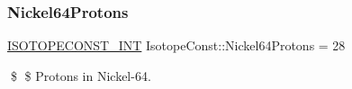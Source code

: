 \subsubsection{\texorpdfstring{Nickel64\+Protons}{Nickel64Protons}}
{\footnotesize\ttfamily \mbox{\hyperlink{group___isotope_const-_macros_ga5f18360b3e99483a35c32d789e62621c}{I\+S\+O\+T\+O\+P\+E\+C\+O\+N\+S\+T\+\_\+\+I\+NT}} Isotope\+Const\+::\+Nickel64\+Protons = 28}

\$ \$ Protons in Nickel-\/64. 